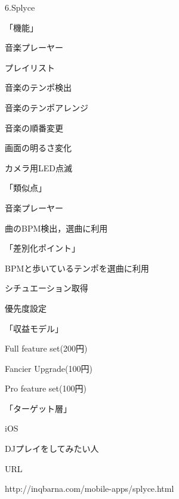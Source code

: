 \par
6.Splyce
\par
「機能」
\par
音楽プレーヤー
\par
プレイリスト
\par
音楽のテンポ検出
\par
音楽のテンポアレンジ
\par
音楽の順番変更
\par
画面の明るさ変化
\par
カメラ用LED点滅
\par
「類似点」
\par
音楽プレーヤー
\par
曲のBPM検出，選曲に利用
\par
「差別化ポイント」
\par
BPMと歩いているテンポを選曲に利用
\par
シチュエーション取得
\par
優先度設定
\par
「収益モデル」
\par
Full feature set(200円)
\par
Fancier Upgrade(100円)
\par
Pro feature set(100円)
\par
「ターゲット層」
\par
iOS
\par
DJプレイをしてみたい人
\par
URL
\par
http://inqbarna.com/mobile-apps/splyce.html

\\
\par
{}\par
